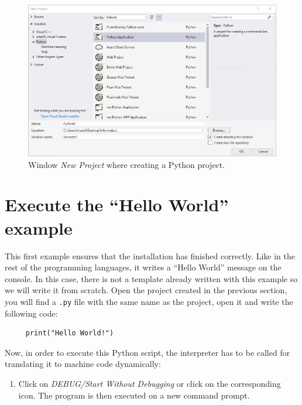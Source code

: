 \begin{figure}[h]
    \centering
    \includegraphics[width= \textwidth]{Figures/PP0V2.png}
    \caption{Window \textit{New Project} where creating a Python project.}
    \label{fig:PP0}
\end{figure}



    \section{Execute the ``Hello World'' example}

This first example ensures that the installation has finished correctly. Like in the rest of the programming languages, it writes a ``Hello World'' message on the console. In this case, there is not a template already written with this example so we will write it from scratch. Open the project created in the previous section, you will find a \texttt{.py} file with the same name as the project, open it and write the following code: %

\vspace{0.5cm} 
\begin{lstlisting}
     print("Hello World!")
\end{lstlisting}

Now, in order to execute this Python script, the interpreter has to be called for translating it to machine code dynamically:

\begin{enumerate}
	\item Click on \textit{DEBUG/Start Without Debugging} or click on the corresponding icon. The program is then executed on a new command prompt.
\end{enumerate}

